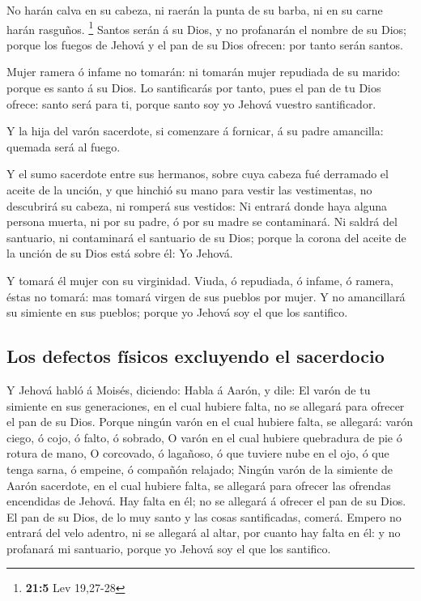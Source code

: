  No harán calva en su cabeza, ni raerán la punta de su
barba, ni en su carne harán rasguños. \footnote{\textbf{21:5} Lev
  19,27-28}  Santos serán á su Dios, y no profanarán el
nombre de su Dios; porque los fuegos de Jehová y el pan de su Dios
ofrecen: por tanto serán santos.

 Mujer ramera ó infame no tomarán: ni tomarán mujer
repudiada de su marido: porque es santo á su Dios.  Lo
santificarás por tanto, pues el pan de tu Dios ofrece: santo será para
ti, porque santo soy yo Jehová vuestro santificador.

 Y la hija del varón sacerdote, si comenzare á fornicar, á
su padre amancilla: quemada será al fuego.

 Y el sumo sacerdote entre sus hermanos, sobre cuya cabeza
fué derramado el aceite de la unción, y que hinchió su mano para vestir
las vestimentas, no descubrirá su cabeza, ni romperá sus vestidos:
 Ni entrará donde haya alguna persona muerta, ni por su
padre, ó por su madre se contaminará.  Ni saldrá del
santuario, ni contaminará el santuario de su Dios; porque la corona del
aceite de la unción de su Dios está sobre él: Yo Jehová.

 Y tomará él mujer con su virginidad.  Viuda,
ó repudiada, ó infame, ó ramera, éstas no tomará: mas tomará virgen de
sus pueblos por mujer.  Y no amancillará su simiente en sus
pueblos; porque yo Jehová soy el que los santifico.

\hypertarget{los-defectos-fuxedsicos-excluyendo-el-sacerdocio}{%
\subsection{Los defectos físicos excluyendo el
sacerdocio}\label{los-defectos-fuxedsicos-excluyendo-el-sacerdocio}}

 Y Jehová habló á Moisés, diciendo:  Habla á
Aarón, y dile: El varón de tu simiente en sus generaciones, en el cual
hubiere falta, no se allegará para ofrecer el pan de su Dios.
 Porque ningún varón en el cual hubiere falta, se allegará:
varón ciego, ó cojo, ó falto, ó sobrado,  O varón en el
cual hubiere quebradura de pie ó rotura de mano,  O
corcovado, ó lagañoso, ó que tuviere nube en el ojo, ó que tenga sarna,
ó empeine, ó compañón relajado;  Ningún varón de la
simiente de Aarón sacerdote, en el cual hubiere falta, se allegará para
ofrecer las ofrendas encendidas de Jehová. Hay falta en él; no se
allegará á ofrecer el pan de su Dios.  El pan de su Dios,
de lo muy santo y las cosas santificadas, comerá.  Empero
no entrará del velo adentro, ni se allegará al altar, por cuanto hay
falta en él: y no profanará mi santuario, porque yo Jehová soy el que
los santifico.

